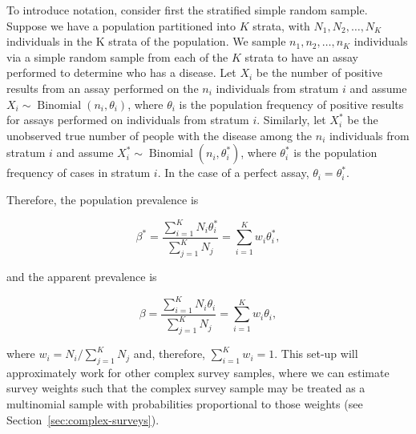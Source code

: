 \documentclass[AMA,STIX1COL]{WileyNJD-v2}
\begin{document}
To introduce notation, consider first the stratified simple random sample.
Suppose we have a population partitioned into   \( K \) strata, with \( N_1, N_2, \ldots, N_K \) individuals in the  K strata of the population.
We sample \( n_1, n_2, \ldots, n_K \) individuals via a simple random sample from each of the \( K \)  strata to have an assay performed to determine who has a disease.
Let \( X_i \) be the number of positive results from an assay performed on the \( n_i \) individuals from stratum \( i \) and assume \( X_i \sim \operatorname{Binomial}(n_i, \theta_i) \), where \( \theta_i \) is the population frequency of positive results for assays performed on individuals from stratum \( i \).
Similarly, let \( X_i^* \) be the unobserved true number of people with the disease among the \( n_i \) individuals from stratum  \( i \) and assume \( X_i^* \sim \operatorname{Binomial}(n_i, \theta_i^*) \), where \( \theta_i^* \) is the population frequency of cases in stratum \( i \).
In the case of a perfect assay, \( \theta_i = \theta_i^* \).




Therefore, the population prevalence is 

\begin{equation}
    \beta^* = \frac{\sum_{i=1}^K N_i \theta_i^*}{\sum_{j=1}^K N_j} = \sum_{i=1}^K w_i \theta_i^*,
    \label{eq:pop-prev}
\end{equation}

and the apparent prevalence is 

\begin{equation}
    \beta = \frac{\sum_{i=1}^K N_i \theta_i}{\sum_{j=1}^K N_j} = \sum_{i=1}^K w_i \theta_i,
    \label{eq:app-prev}
\end{equation}

where \( w_i = N_i / \sum_{j=1}^K N_j \) and, therefore, \( \sum_{i=1}^K w_i = 1 \).
This set-up will approximately work for other complex survey samples, where we can estimate survey weights such that the complex survey sample may be treated as a multinomial sample with probabilities proportional to those weights  (see Section~\ref{sec:complex-surveys}).
\end{document}
